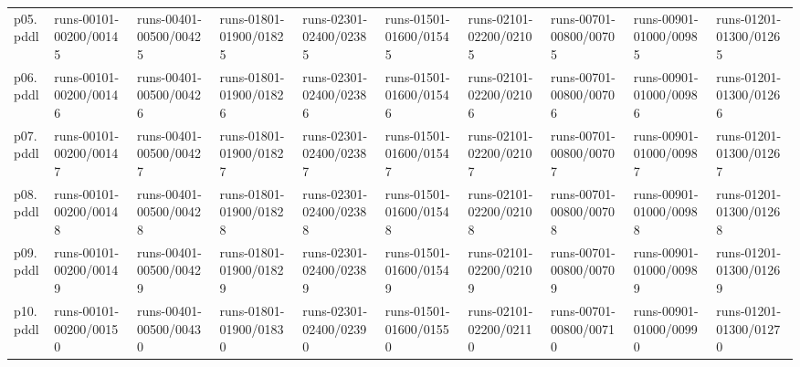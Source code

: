 \documentclass{article}
\begin{document}
\begin{tabular}{@{}lrrrrrrrrr@{}}
p05.pddl & \multicolumn{1}{|l|}{runs-00101-00200/00145} & \multicolumn{1}{|l|}{runs-00401-00500/00425} & \multicolumn{1}{|l|}{runs-01801-01900/01825} & \multicolumn{1}{|l|}{runs-02301-02400/02385} & \multicolumn{1}{|l|}{runs-01501-01600/01545} & \multicolumn{1}{|l|}{runs-02101-02200/02105} & \multicolumn{1}{|l|}{runs-00701-00800/00705} & \multicolumn{1}{|l|}{runs-00901-01000/00985} & \multicolumn{1}{|l|}{runs-01201-01300/01265} \\
p06.pddl & \multicolumn{1}{|l|}{runs-00101-00200/00146} & \multicolumn{1}{|l|}{runs-00401-00500/00426} & \multicolumn{1}{|l|}{runs-01801-01900/01826} & \multicolumn{1}{|l|}{runs-02301-02400/02386} & \multicolumn{1}{|l|}{runs-01501-01600/01546} & \multicolumn{1}{|l|}{runs-02101-02200/02106} & \multicolumn{1}{|l|}{runs-00701-00800/00706} & \multicolumn{1}{|l|}{runs-00901-01000/00986} & \multicolumn{1}{|l|}{runs-01201-01300/01266} \\
p07.pddl & \multicolumn{1}{|l|}{runs-00101-00200/00147} & \multicolumn{1}{|l|}{runs-00401-00500/00427} & \multicolumn{1}{|l|}{runs-01801-01900/01827} & \multicolumn{1}{|l|}{runs-02301-02400/02387} & \multicolumn{1}{|l|}{runs-01501-01600/01547} & \multicolumn{1}{|l|}{runs-02101-02200/02107} & \multicolumn{1}{|l|}{runs-00701-00800/00707} & \multicolumn{1}{|l|}{runs-00901-01000/00987} & \multicolumn{1}{|l|}{runs-01201-01300/01267} \\
p08.pddl & \multicolumn{1}{|l|}{runs-00101-00200/00148} & \multicolumn{1}{|l|}{runs-00401-00500/00428} & \multicolumn{1}{|l|}{runs-01801-01900/01828} & \multicolumn{1}{|l|}{runs-02301-02400/02388} & \multicolumn{1}{|l|}{runs-01501-01600/01548} & \multicolumn{1}{|l|}{runs-02101-02200/02108} & \multicolumn{1}{|l|}{runs-00701-00800/00708} & \multicolumn{1}{|l|}{runs-00901-01000/00988} & \multicolumn{1}{|l|}{runs-01201-01300/01268} \\
p09.pddl & \multicolumn{1}{|l|}{runs-00101-00200/00149} & \multicolumn{1}{|l|}{runs-00401-00500/00429} & \multicolumn{1}{|l|}{runs-01801-01900/01829} & \multicolumn{1}{|l|}{runs-02301-02400/02389} & \multicolumn{1}{|l|}{runs-01501-01600/01549} & \multicolumn{1}{|l|}{runs-02101-02200/02109} & \multicolumn{1}{|l|}{runs-00701-00800/00709} & \multicolumn{1}{|l|}{runs-00901-01000/00989} & \multicolumn{1}{|l|}{runs-01201-01300/01269} \\
p10.pddl & \multicolumn{1}{|l|}{runs-00101-00200/00150} & \multicolumn{1}{|l|}{runs-00401-00500/00430} & \multicolumn{1}{|l|}{runs-01801-01900/01830} & \multicolumn{1}{|l|}{runs-02301-02400/02390} & \multicolumn{1}{|l|}{runs-01501-01600/01550} & \multicolumn{1}{|l|}{runs-02101-02200/02110} & \multicolumn{1}{|l|}{runs-00701-00800/00710} & \multicolumn{1}{|l|}{runs-00901-01000/00990} & \multicolumn{1}{|l|}{runs-01201-01300/01270} \\

\end{tabular}
\end{document}
